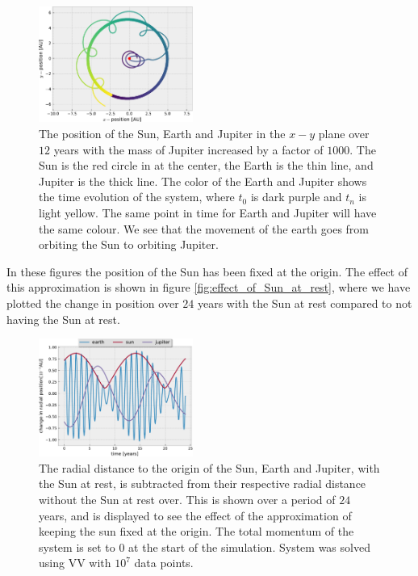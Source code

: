 \documentclass[%
 reprint,
nofootinbib,
aps,
]{revtex4-1}
\begin{document}
\begin{figure}
  \centering
  \includegraphics[width=0.45\textwidth]{../figures/jupiter_1000_mass.pdf}
  \caption{The position of the Sun, Earth and Jupiter in the $x-y$ plane over $12$ years with the mass of Jupiter increased by a factor of $1000$. The Sun is the red circle in at the center, the Earth is the thin line, and Jupiter is the thick line. The color of the Earth and Jupiter shows the time evolution of the system, where $t_0$ is dark purple and $t_n$ is light yellow. The same point in time for Earth and Jupiter will have the same colour. We see that the movement of the earth goes from orbiting the Sun to orbiting Jupiter.}
  \label{fig:Earth_becomes_moon}
\end{figure}

In these figures the position of the Sun has been fixed at the origin. The effect of this approximation is shown in figure \vref{fig:effect_of_Sun_at_rest}, where we have plotted the change in position over $24$ years with the Sun at rest compared to not having the Sun at rest.
\begin{figure}
  \centering
  \includegraphics[width=0.45\textwidth]{../figures/sun_movement_effect.pdf}
  \caption{The radial distance to the origin of the Sun, Earth and Jupiter, with the Sun at rest, is subtracted from their respective radial distance without the Sun at rest over. This is shown over a period of $24$ years, and is displayed to see the effect of the approximation of keeping the sun fixed at the origin. The total momentum of the system is set to $0$ at the start of the simulation. System was solved using VV with $10^7$ data points.}
  \label{fig:effect_of_Sun_at_rest}
\end{figure}
\end{document}
